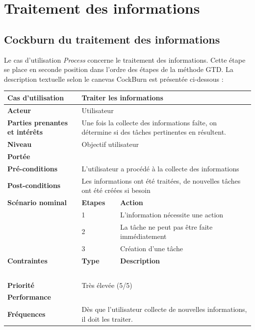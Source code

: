 \section {Traitement des informations}



\subsection*{Cockburn du traitement des informations}

Le cas d'utilisation \textit{Process} concerne le traitement des informations. Cette étape se place en seconde position dans l'ordre des étapes de la méthode GTD. La description textuelle selon le canevas CockBurn est présentée ci-dessous :

\begin{center}
\begin{tabular}{|p{1.1in}|p{0.6in}|p{1.8in}|p{1.5in}|} \hline 
\textbf{Cas d'utilisation} & \multicolumn{3}{|p{2.9in}|}{Traiter les informations} \\ \hline 
\textbf{Acteur} & \multicolumn{3}{|p{2.9in}|}{Utilisateur} \\ \hline 
\textbf{Parties 
prenantes et intérêts} & \multicolumn{3}{|p{2.9in}|}{Une fois la collecte des informations 
faîte, on détermine si des tâches pertinentes en résultent.} \\ \hline 
\textbf{Niveau} & \multicolumn{3}{|p{2.9in}|}{Objectif utilisateur} \\ \hline 
\textbf{Portée} & \multicolumn{3}{|p{2.9in}|}{~} \\ \hline 
\textbf{Pré-conditions} & \multicolumn{3}{|p{2.9in}|}{L'utilisateur a procédé à la collecte 
des informations} \\ \hline 
\textbf{Post-conditions} & \multicolumn{3}{|p{2.9in}|}{Les informations ont été traitées, 
de nouvelles tâches ont été créées si besoin} \\ \hline 



\textbf{Scénario nominal} & \textbf{Etapes}  & \multicolumn{2}{|p{2.5in}|}{\textbf{Action}}   \\ \hline 
 & 1 & \multicolumn{2}{|p{2.5in}|}{L'information nécessite une action} \\ \hline 
 & 2 & \multicolumn{2}{|p{2.5in}|}{La 
tâche ne peut pas être faite immédiatement} \\ \hline 
 & 3 & \multicolumn{2}{|p{2.5in}|}{Création d'une tâche} \\ \hline 
\textbf{Contraintes} & \textbf{Type} & \multicolumn{2}{|p{2.5in}|}{\textbf{Description}} \\ \hline 
 & ~ & \multicolumn{2}{|p{2.5in}|}{~} \\ \hline 
\textbf{Priorité} & \multicolumn{3}{|p{2.9in}|}{Très élevée (5/5)} \\ \hline 
\textbf{Performance} & \multicolumn{3}{|p{2.9in}|}{~} \\ \hline 
\textbf{Fréquences} & \multicolumn{3}{|p{2.9in}|}{Dès que l'utilisateur collecte de nouvelles 
informations, il doit les traiter.} \\ \hline 
\end{tabular}\end{center}
